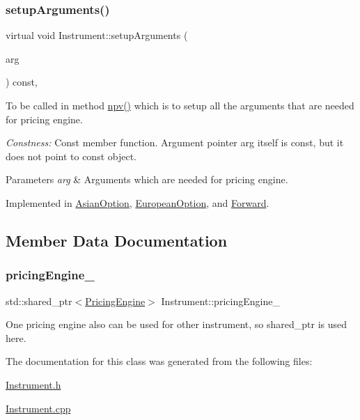\subsubsection{\texorpdfstring{setup\+Arguments()}{setupArguments()}}
{\footnotesize\ttfamily virtual void Instrument\+::setup\+Arguments (\begin{DoxyParamCaption}\item[{\hyperlink{class_pricing_engine_1_1_arguments}{Pricing\+Engine\+::\+Arguments} $\ast$const}]{arg }\end{DoxyParamCaption}) const\hspace{0.3cm}{\ttfamily [protected]}, {}}



To be called in method \hyperlink{class_instrument_aa750f2ae95a21d65a073da3171e8d084}{npv()} which is to setup all the arguments that are needed for pricing engine. 

{\itshape Constness\+:} Const member function. Argument pointer arg itself is const, but it does not point to const object. 
\begin{DoxyParams}{Parameters}
{\em arg} & Arguments which are needed for pricing engine. \\
\hline
\end{DoxyParams}


Implemented in \hyperlink{class_asian_option_a82c9b5fb3bea69f476a65e9675e1cc28}{Asian\+Option}, \hyperlink{class_european_option_a77e3bc17dbcf317561c4920f6bfa84de}{European\+Option}, and \hyperlink{class_forward_a909ab0cefa0ab42bdaf3bf6e84ac0096}{Forward}.



\subsection{Member Data Documentation}
\hypertarget{class_instrument_a6fdd5548ccc944536ff73913d98bf598}{}\label{class_instrument_a6fdd5548ccc944536ff73913d98bf598} 
\subsubsection{\texorpdfstring{pricing\+Engine\+\_\+}{pricingEngine\_}}
{\footnotesize\ttfamily std\+::shared\+\_\+ptr$<$\hyperlink{class_pricing_engine}{Pricing\+Engine}$>$ Instrument\+::pricing\+Engine\+\_\+\hspace{0.3cm}{\ttfamily [protected]}}



One pricing engine also can be used for other instrument, so shared\+\_\+ptr is used here. 



The documentation for this class was generated from the following files\+:\begin{DoxyCompactItemize}
\item 
\hyperlink{_instrument_8h}{Instrument.\+h}\item 
\hyperlink{_instrument_8cpp}{Instrument.\+cpp}\end{DoxyCompactItemize}
